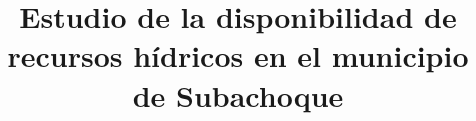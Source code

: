\documentclass[draft]{agujournal2019}
\begin{document}
%
%


\title{Estudio de la disponibilidad de recursos hídricos en el municipio de Subachoque}

%
%











\end{document}
